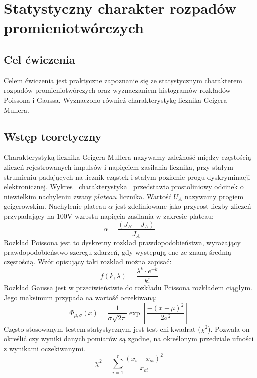 \documentclass{article}
\begin{document}
\section{Statystyczny charakter rozpadów promieniotwórczych}
\subsection{Cel ćwiczenia}
Celem ćwiczenia jest praktyczne zapoznanie się ze statystycznym charakterem rozpadów promieniotwórczych oraz wyznaczaniem histogramów rozkładów Poissona i Gaussa. Wyznaczono również charakterystykę licznika Geigera-Mullera.
\subsection{Wstęp teoretyczny}
Charakterystyką licznika Geigera-Mullera nazywamy zależność między częstością zliczeń rejestrowanych impulsów i napięciem zasilania licznika, przy stałym strumieniu padających na licznik cząstek i stałym poziomie progu dyskryminacji elektronicznej. Wykres [\ref{charakterystyka}] przedstawia prostoliniowy odcinek o niewielkim nachyleniu zwany $plateau$ licznika. Wartość $U_A$ nazywamy progiem geigerowskim. Nachylenie plateau $\alpha$ jest zdefiniowane jako przyrost liczby zliczeń przypadający na 100V wzrostu napięcia zasilania w zakresie plateau:
\begin{equation}
\label{nachylenie}
	 \alpha = \frac{(J_B - J_A)}{J_A}
\end{equation}
Rozkład Poissona jest to dyskretny rozkład prawdopodobieństwa, wyrażający prawdopodobieństwo szeregu zdarzeń, gdy występują one ze znaną średnią częstością. Wzór opisujący taki rozkład można zapisać:
\begin{equation}
\label{poisson}
	f(k,\lambda) = \frac{\lambda^k \cdot e^{-k}}{k!}
\end{equation}
Rozkład Gaussa jest w przeciwieństwie do rozkładu Poissona rozkładem ciągłym. Jego maksimum przypada na wartość oczekiwaną:
\begin{equation}
	\label{gauss}
	\Phi_{\mu,\sigma}(x) = \frac{1}{\sigma\sqrt{2\pi}}\exp{\left[\frac{-(x-\mu)^2}{2\sigma^2} \right]}
\end{equation}
Często stosowanym testem statystycznym jest test chi-kwadrat ($\chi^2$). Pozwala on określić czy wyniki danych pomiarów są zgodne, na określonym przedziale ufności z wynikami oczekiwanymi.
\begin{equation}
	\label{chi}
	\chi^2 = \sum_{i=1}^{r}\frac{(x_i - x_{oi})^2}{x_{oi}}
\end{equation}
\end{document}
